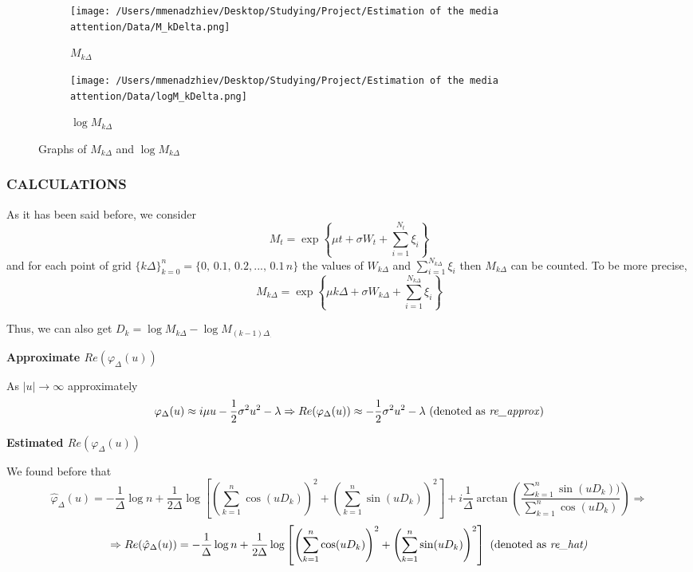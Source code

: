 \begin{figure}[htbp]
    \centering
    \begin{subfigure}{0.45\textwidth}
        \centering
        \texttt{[image: /Users/mmenadzhiev/Desktop/Studying/Project/Estimation of the media attention/Data/M\_kDelta.png]}
        \caption{ $M_{k \Delta}$}
        \label{fig:sub1}
    \end{subfigure}
    \begin{subfigure}{0.45\textwidth}
        \centering
        \texttt{[image: /Users/mmenadzhiev/Desktop/Studying/Project/Estimation of the media attention/Data/logM\_kDelta.png]}
        \caption{$\log {M_{k \Delta}}$}
        \label{fig:sub2}
    \end{subfigure}
    \caption{Graphs of $M_{k \Delta}$ and $\log {M_{k \Delta}}$}
    \label{fig:main}
\end{figure}


\subsubsection{CALCULATIONS}

As it has been said before, we consider \[ M_t = \exp \left\{\mu t + \sigma W_t + \sum\limits_{i=1}^{N_t} \xi_i \right\} \] and for each point of grid $\{ k \Delta\}_{k=0}^{n}  =  \{0, \, 0.1, \, 0.2, ..., \, 0.1 \, n \}$ the values of $W_{k \Delta}$ and $\sum\limits_{i=1}^{N_{k\Delta}} \xi_i$ then $M_{k \Delta}$ can be counted. To be more precise, \[ M_{k \Delta} = \exp \left\{\mu k \Delta + \sigma W_{k \Delta} + \sum\limits_{i=1}^{N_{k \Delta}} \xi_i \right\} \]

Thus, we can also get $D_k = \log M_{k \Delta} - \log M_{(k - 1) \Delta_.}$

\textbf{Approximate $Re(\varphi_{\Delta}(u))$}

As $|u| \rightarrow \infty$ approximately
$$
\varphi_{\Delta}(u) \approx i \mu u - \frac{1}{2} \sigma^2 u^2 - \lambda \Rightarrow Re(\varphi_{\Delta}(u)) \approx - \frac{1}{2} \sigma^2 u^2 - \lambda \text{ (denoted as \textit{re\_approx})}
$$

\textbf{Estimated $Re(\varphi_{\Delta}(u))$}

We found before that \[ \hat{\varphi}_{\Delta}(u) = -\frac{1}{\Delta} \log n + \frac{1}{2 \Delta} \log \left[ \left( \sum\limits_{k=1}^n \cos(u D_k) \right)^2 + \left(\sum\limits_{k=1}^n \sin(u D_k) \right)^2 \right] + i \frac{1}{\Delta} \arctan \left(\frac{\sum_{k=1}^n \sin(u D_k))}{\sum_{k=1}^n \cos(u D_k)} \right) \Rightarrow \] \[ \Rightarrow Re(\hat{\varphi}_{\Delta}(u)) = -\frac{1}{\Delta} \log n + \frac{1}{2 \Delta} \log \left[ \left( \sum\limits_{k=1}^n \cos(u D_k) \right)^2 + \left(\sum\limits_{k=1}^n \sin(u D_k) \right)^2 \right] \text{ (denoted as \textit{re\_hat)}} \]

